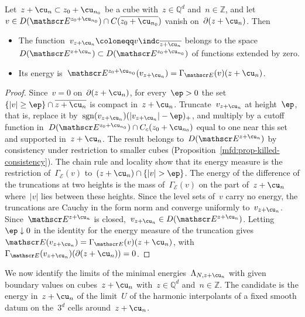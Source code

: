 \documentclass[11pt]{amsart}
\begin{document}
\begin{lemma}
\label{mfd:lem-truncation}
Let~$z+\cu_n\subset z_0+\cu_{n_0}$ be a cube with~$z\in\mathbb Q^d$ and~$n\in\mathbb Z$, and let~$v\in D(\mathscr E^{z_0+\cu_{n_0}})\cap C(\overline{z_0+\cu_{n_0}})$ vanish on~$\partial(z+\cu_n)$. Then
\begin{itemize}
\item The function~$v_{z+\cu_n}\coloneqq v\indc_{\overline{z+\cu_n}}$ belongs to the space~$D(\mathscr E^{z+\cu_n})\subset D(\mathscr E^{z_0+\cu_{n_0}})$ of functions extended by zero.
\item Its energy is~$\mathscr E^{z_0+\cu_{n_0}}(v_{z+\cu_n})=\Gamma_{\mathscr E}(v)(z+\cu_n)$.
\end{itemize}
\end{lemma}

\begin{proof}
Since~$v=0$ on~$\partial(z+\cu_n)$, for every~$\ep>0$ the set~$\{|v|\geq\ep\}\cap\overline{z+\cu_n}$ is compact in~$z+\cu_n$. Truncate~$v_{z+\cu_n}$ at height~$\ep$, that is, replace it by~$\operatorname{sgn}(v_{z+\cu_n})(|v_{z+\cu_n}|-\ep)_+$, and multiply by a cutoff function in~$D(\mathscr E^{z_0+\cu_{n_0}})\cap C_c(z_0+\cu_{n_0})$ equal to one near this set and supported in~$z+\cu_n$. The result belongs to~$D(\mathscr E^{z+\cu_n})$ by consistency under restriction to smaller cubes (Proposition~\ref{mfd:prop-killed-consistency}). The chain rule and locality show that its energy measure is the restriction of~$\Gamma_{\mathscr E}(v)$ to~$(z+\cu_n)\cap\{|v|>\ep\}$. The energy of the difference of the truncations at two heights is the mass of~$\Gamma_{\mathscr E}(v)$ on the part of~$z+\cu_n$ where~$|v|$ lies between these heights. Since the level sets of~$v$ carry no energy, the truncations are Cauchy in the form norm and converge uniformly to~$v_{z+\cu_n}$. Since~$\mathscr E^{z+\cu_n}$ is closed,~$v_{z+\cu_n}\in D(\mathscr E^{z+\cu_n})$. Letting~$\ep\downarrow0$ in the identity for the energy measure of the truncation gives~$\mathscr E(v_{z+\cu_n})=\Gamma_{\mathscr E}(v)(z+\cu_n)$, with~$\Gamma_{\mathscr E}(v_{z+\cu_n})(\partial(z+\cu_n))=0$.
\end{proof}

We now identify the limits of the minimal energies~$\Lambda_{N,z+\cu_n}$ with given boundary values on cubes~$z+\cu_n$ with~$z\in\mathbb Q^d$ and~$n\in\mathbb Z$. The candidate is the energy in~$z+\cu_n$ of the limit~$U$ of the harmonic interpolants of a fixed smooth datum on the~$3^d$ cells around~$z+\cu_n$.
\end{document}
